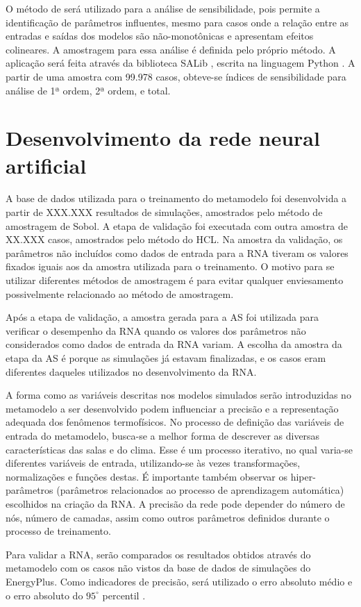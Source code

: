 \documentclass[brazil,hardcopy,openany,a5paper]{ufscthesis}
\begin{document}
		O método de  \cite{Sobol1993} será utilizado para a análise de sensibilidade, pois permite a identificação de parâmetros influentes, mesmo para casos onde a relação entre as entradas e saídas dos modelos são não-monotônicas  e apresentam efeitos colineares. A amostragem para essa análise é definida pelo próprio método. A aplicação será feita através da biblioteca SALib \cite{Herman2017}, escrita na linguagem Python \cite{Python}. A partir de uma amostra com 99.978 casos, obteve-se índices de sensibilidade para análise de 1ª ordem, 2ª ordem, e total.
		
		\section{Desenvolvimento da rede neural artificial}
		
		A base de dados utilizada para o treinamento do metamodelo foi desenvolvida a partir de XXX.XXX resultados de simulações, amostrados pelo método de amostragem de Sobol. A etapa de validação foi executada com outra amostra de XX.XXX casos, amostrados pelo método do HCL. Na amostra da validação, os parâmetros não incluídos como dados de entrada para a RNA tiveram os valores fixados iguais aos da amostra utilizada para o treinamento. O motivo para se utilizar diferentes métodos de amostragem é para evitar qualquer enviesamento possivelmente relacionado ao método de amostragem.
		
		Após a etapa de validação, a amostra gerada para a AS foi utilizada para verificar o desempenho da RNA quando os valores dos parâmetros não considerados como dados de entrada da RNA variam. A escolha da amostra da etapa da AS é porque as simulações já estavam finalizadas, e os casos eram diferentes daqueles utilizados no desenvolvimento da RNA. 
		
		A forma como as variáveis descritas nos modelos simulados serão introduzidas no metamodelo a ser desenvolvido podem influenciar a precisão e a representação adequada dos fenômenos termofísicos. No processo de definição das variáveis de entrada do metamodelo, busca-se a melhor forma de descrever as diversas características das salas e do clima. Esse é um processo iterativo, no qual varia-se diferentes variáveis de entrada, utilizando-se às vezes transformações, normalizações e funções destas. É importante também observar os hiper-parâmetros (parâmetros relacionados ao processo de aprendizagem automática) escolhidos na criação da RNA. A precisão da rede pode depender do número de nós, número de camadas, assim como outros parâmetros definidos durante o processo de treinamento.
		
		Para validar a RNA, serão comparados os resultados obtidos através do metamodelo com os casos não vistos da base de dados de simulações do EnergyPlus. Como indicadores de precisão, será utilizado o erro absoluto médio e o erro absoluto do $95^{\circ}$ percentil .
		

%
%

	
\end{document}
